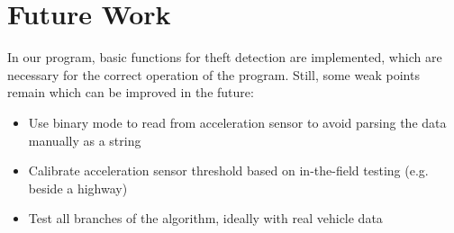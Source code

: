 \chapter{Future Work}
In our program, basic functions for theft detection are implemented, which are necessary for the correct operation of the program. Still, some weak points remain which can be improved in the future:
\begin{itemize}
	\item Use binary mode to read from acceleration sensor to avoid parsing the data manually as a string
	\item Calibrate acceleration sensor threshold based on in-the-field testing (e.g. beside a highway)
	\item Test all branches of the algorithm, ideally with real vehicle data
\end{itemize}

\clearpage